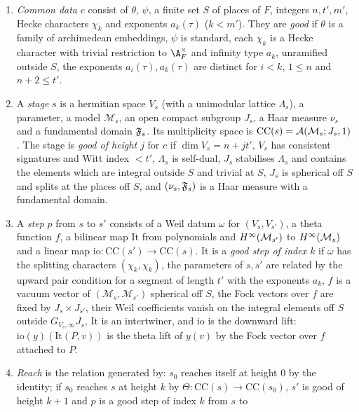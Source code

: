 \begin{definition}\label{pf:fs:stages}
\begin{enumerate}[label=(\alph*)]
\item \emph{Common data} $c$ consist of $\theta$, $\psi$, a finite set $S$ of places of $F$, integers $n,t',m'$, Hecke characters
$\chi_k$ and exponents $a_k(\tau)$ ($k<m'$). They are \emph{good} if $\theta$ is a family of archimedean embeddings, $\psi$ is standard,
each $\chi_k$ is a Hecke character with trivial restriction to $\A_F^\times$ and infinity type $a_k$, unramified outside $S$, the
exponents $a_i(\tau),a_k(\tau)$ are distinct for $i<k$, $1\le n$ and $n+2\le t'$.
\item A \emph{stage} $s$ is a hermitian space $V_s$ (with a unimodular lattice $\Lambda_s$), a parameter, a model $\mathcal M_s$, an open
compact subgroup $J_s$, a Haar measure $\nu_s$ and a fundamental domain $\mathfrak F_s$. Its multiplicity space is
$\mathrm{CC}(s)=\mathcal A(\mathcal M_s;J_s,1)$. The stage is \emph{good of height $j$} for $c$ if $\dim V_s=n+jt'$, $V_s$ has consistent
signatures and Witt index $<t'$, $\Lambda_s$ is self-dual, $J_s$ stabilises $\Lambda_s$ and contains the elements which are integral
outside $S$ and trivial at $S$, $J_s$ is spherical off $S$ and splits at the places off $S$, and $(\nu_s,\mathfrak F_s)$ is a Haar measure
with a fundamental domain.
\item A \emph{step} $p$ from $s$ to $s'$ consists of a Weil datum $\omega$ for $(V_s,V_{s'})$, a theta function $f$, a bilinear map
$\mathrm{It}$ from polynomials and $H^{\infty}(\mathcal M_{s'})$ to $H^{\infty}(\mathcal M_s)$ and a linear map
$\mathrm{io}\colon\mathrm{CC}(s')\to\mathrm{CC}(s)$. It is a \emph{good step of index $k$} if $\omega$ has the splitting characters
$(\chi_k,\chi_k)$, the parameters of $s,s'$ are related by the upward pair condition for a segment of length $t'$ with the exponents
$a_k$, $f$ is a vacuum vector of $(\mathcal M_s,\mathcal M_{s'})$ spherical off $S$, the Fock vectors over $f$ are fixed by
$J_s\times J_{s'}$, their Weil coefficients vanish on the integral elements off $S$ outside $G_{V_s,\infty}J_s$, $\mathrm{It}$ is an
intertwiner, and $\mathrm{io}$ is the downward lift: $\mathrm{io}(y)(\mathrm{It}(P,v))$ is the theta lift of $y(v)$ by the Fock
vector over $f$ attached to $P$.
\item \emph{Reach} is the relation generated by: $s_0$ reaches itself at height $0$ by the identity; if $s_0$ reaches $s$ at height
$k$ by $\Theta\colon\mathrm{CC}(s)\to\mathrm{CC}(s_0)$, $s'$ is good of height $k+1$ and $p$ is a good step of index $k$ from $s$ to

\end{enumerate}
\end{definition}
